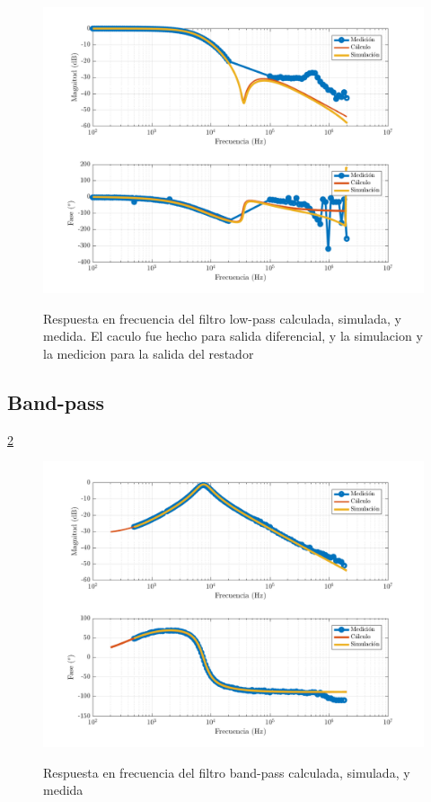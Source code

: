 \begin{figure}
	\includegraphics[width=\textwidth]{imagenes/LP_bode}
	\label{fig:ej2_LP_bode}
	\caption{Respuesta en frecuencia del filtro low-pass calculada, simulada, y medida. El caculo fue hecho para salida diferencial, y la simulacion y la medicion para la salida del restador}
\end{figure}


\subsection{Band-pass}

\ref{fig:ej2_BP_bode}
\begin{figure}
	\includegraphics[width=\textwidth]{imagenes/BP_bode}
	\label{fig:ej2_BP_bode}
	\caption{Respuesta en frecuencia del filtro band-pass calculada, simulada, y medida}
\end{figure}


